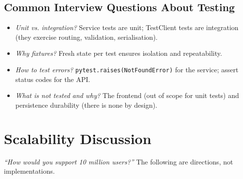 \documentclass[11pt,a4paper]{report}
\begin{document}
\section{Common Interview Questions About Testing}
\begin{itemize}[leftmargin=1.4em]
  \item \emph{Unit vs. integration?} Service tests are unit; TestClient tests are
        integration (they exercise routing, validation, serialisation).
  \item \emph{Why fixtures?} Fresh state per test ensures isolation and
        repeatability.
  \item \emph{How to test errors?} \texttt{pytest.raises(NotFoundError)} for the
        service; assert status codes for the API.
  \item \emph{What is not tested and why?} The frontend (out of scope for unit
        tests) and persistence durability (there is none by design).
\end{itemize}

\chapter{Scalability Discussion}

\emph{``How would you support 10 million users?''} The following are directions,
not implementations.
\end{document}
